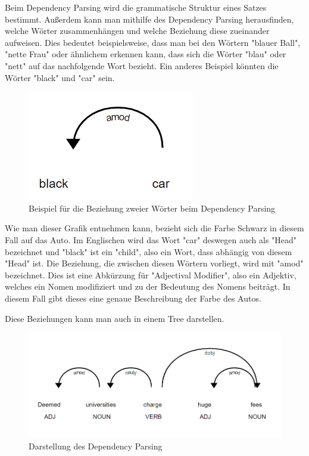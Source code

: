 Beim Dependency Parsing wird die grammatische Struktur eines Satzes bestimmt.
Außerdem kann man mithilfe des Dependency Parsing herausfinden, welche Wörter zusammenhängen und welche Beziehung diese zueinander aufweisen.
Dies bedeutet beispielsweise, dass man bei den Wörtern "blauer Ball", "nette Frau" oder ähnlichem erkennen kann, dass sich die Wörter "blau" oder "nett" auf das nachfolgende Wort bezieht.
Ein anderes Beispiel könnten die Wörter "black" und "car" sein.

\begin{figure}[hbt!]
    \centering
    \includegraphics[scale=1]{pics/dependency_parsing}
    \caption{Beispiel für die Beziehung zweier Wörter beim Dependency Parsing~\cite{dependencyParsing}}
    \label{fig:dependency_parsing_relation}
\end{figure}

Wie man dieser Grafik entnehmen kann, bezieht sich die Farbe Schwarz in diesem Fall auf das Auto.
Im Englischen wird das Wort "car" deswegen auch als "Head" bezeichnet und "black" ist ein "child", also ein Wort, dass abhängig von diesem "Head" ist.
Die Beziehung, die zwischen diesen Wörtern vorliegt, wird mit "amod" bezeichnet.
Dies ist eine Abkürzung für "Adjectival Modifier", also ein Adjektiv, welches ein Nomen modifiziert und zu der Bedeutung des Nomens beiträgt.
In diesem Fall gibt dieses eine genaue Beschreibung der Farbe des Autos.\cite{dependencyParsing}

Diese Beziehungen kann man auch in einem Tree darstellen.

\begin{figure}[hbt!]
    \centering
    \includegraphics[scale=0.5]{pics/dependency_parsing_tree}
    \caption{Darstellung des Dependency Parsing~\cite{dependencyParsing}}
    \label{fig:dependency_parsing_tree}
\end{figure}

